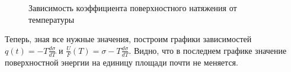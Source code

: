 \documentclass[a4paper, 12pt]{article} %
\begin{document}
\begin{figure}[h]
	\caption{Зависимость коэффициента поверхностного натяжения от температуры}
	\label{gr:1}
\end{figure}

Теперь, зная все нужные значения, построим графики зависимостей $q(t) = -T \frac{d \sigma}{dT}$ и $\frac{U}{F}(T) = \sigma - T\frac{d \sigma}{dT}$. Видно, что в последнем графике значение поверхностной энергии на единицу площади почти не меняется.

\begin{figure}[h]
	\label{gr:2}
\end{figure}
\end{document}
